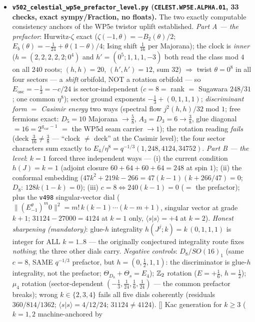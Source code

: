 \documentclass[11pt]{article}
\providecommand{\gcar}{g_{\mathrm{car}}}\providecommand{\Nfam}{N_{\mathrm{fam}}}
\begin{document}
\begin{itemize}[leftmargin=1.5em]
\item \textbf{\texttt{v502\_celestial\_wp5e\_prefactor\_level.py} (\texttt{CELEST.WP5E.ALPHA.01}, 33
checks, exact sympy/Fraction, no floats).} The two exactly computable consistency anchors of the
WP5e twistor uplift established. \emph{Part A --- the prefactor}: Hurwitz-$\zeta$ exact
($\zeta(-1,\theta)=-B_2(\theta)/2$; $E_b(\theta)=-\tfrac1{24}+\theta(1-\theta)/4$; Ising shift
$\tfrac1{16}$ per Majorana); the clock is \emph{inner} ($h=(2,2,2,2,2;0^4)$ and $h'=(0^5;1,1,1,-3)$
both read the class mod $4$ on all $240$ roots; $(h,h)=20$, $(h',h')=12$, sum $32$) $\Rightarrow$
twist $\theta=0^8$ in all four sectors --- a \emph{shift} orbifold, NOT a rotation orbifold ---
so $E_{\mathrm{osc}}=-\tfrac13=-c/24$ is sector-independent ($c=8=$ rank $=$ Sugawara $248/31$;
one common $\eta^8$); sector ground exponents $-\tfrac13+(0,1,1,1)$; \emph{discriminant form $=$
Casimir energy} two ways (spectral flow $j^2(h,h)/32$ mod $1$; free fermions exact: $D_5=10$
Majorana $\to\tfrac58$, $A_3=D_3=6\to\tfrac38$, glue diagonal $=16=2^{\gcar-1}$ $=$ the WP5d seam
carrier $\to1$); the rotation reading \emph{fails} (deck $\tfrac3{16}\neq\tfrac38$ --- ``clock
$\neq$ deck'' at the Casimir level); the four sector characters sum exactly to
$E_4/\eta^8=q^{-1/3}(1,248,4124,34752)$. \emph{Part B --- the level}: $k=1$ forced three
independent ways --- (i) the current condition $h(J)=k=1$ (adjoint closure $60{+}64{+}60{+}64=248$
at spin $1$); (ii) the conformal embedding ($47k^2{+}219k{-}266=47(k{-}1)(k{+}266/47)=0$; $D_8$:
$128k(1{-}k)=0$); (iii) $c=8\Leftrightarrow240(k{-}1)=0$ ($=$ the prefactor); plus the \texttt{v498}
singular-vector dial ($\|(E^\theta_{-1})^m0\|^2=m!\,k(k{-}1)\cdots(k{-}m{+}1)$, singular vector at
grade $k{+}1$; $31124-27000=4124$ at $k{=}1$ only, $\langle s|s\rangle=+4$ at $k{=}2$).
\emph{Honest sharpening (mandatory)}: glue-$h$ integrality $h(J^j;k)=k\,(0,1,1,1)$ is integer for
ALL $k=1..8$ --- the originally conjectured integrality route fixes \emph{nothing}; the three other
dials carry. \emph{Negative controls}: $D_8/SO(16)_1$ (same $c=8$, SAME $q^{-1/3}$ prefactor, but
$h=(0,\tfrac12,1,1)$: the discriminator is glue-$h$ integrality, not the prefactor;
$\Theta_{D_8}+\Theta_s=E_4$); $\mathbb{Z}_2$ rotation ($E=+\tfrac16$, $h=\tfrac12$); $\mu_4$ rotation
(sector-dependent $(-\tfrac13,\tfrac1{24},\tfrac16,\tfrac1{24})$ --- the common prefactor breaks);
wrong $k\in\{2,3,4\}$ fails all five dials coherently (residuals $360/814/1362$; $\langle
s|s\rangle=4/12/24$; $31124\neq4124$). [\mC] Kac generation for $k\ge3$ ($k=1,2$ machine-anchored by

\end{itemize}
\end{document}
